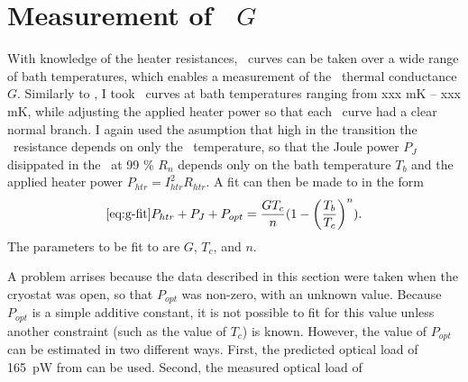 \section{Measurement of \TES\ $G$}

With knowledge of the heater resistances, \IV\ curves can be taken over a wide range of bath temperatures, which enables a measurement of the \TES\ thermal conductance $G$.
Similarly to , I took \IV\ curves at bath temperatures ranging from xxx mK -- xxx mK, while adjusting the applied heater power so that each \IV\ curve had a clear normal branch.
I again used the asumption that high in the transition the \TES\ resistance depends on only the \TES\ temperature, so that the Joule power $P_J$ disippated in the \TES\ at 99 \% $R_n$ depends only on the bath temperature $T_b$ and the applied heater power $P_{htr} = I_{htr}^2 R_{htr}$. A fit can then be made to  in the form
\begin{equation}\ref{eq:g-fit}
P_{htr} + P_J + P_{opt}= \frac{G T_c}{n}(1 - \left(\frac{T_b}{T_c}\right)^n).
\end{equation}
The parameters to be fit to are $G$, $T_c$, and $n$.

A problem arrises because the data described in this section were taken when the cryostat was open, so that $P_{opt}$ was non-zero, with an unknown value.
Because $P_{opt}$ is a simple additive constant, it is not possible to fit for this value unless another constraint (such as the value of $T_c$) is known.
However, the value of $P_{opt}$ can be estimated in two different ways. 
First, the predicted optical load of 165~pW from  can be used.
Second, the measured optical load of 


